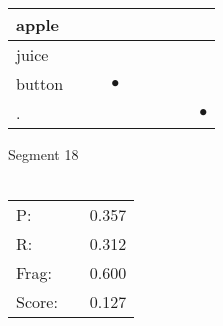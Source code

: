 \documentclass[landscape]{article}
\newcommand{\ssp}{\hspace{2pt}}
\newcommand{\mex}{\cellcolor{g}$\bullet$}
\begin{document}
\begin{tabular}{|l|p{10pt}|p{10pt}|p{10pt}|p{10pt}|p{10pt}|p{10pt}|p{10pt}|p{10pt}|}
\hline
\ssp apple \ssp&\hspace{2pt}&\hspace{2pt}&\hspace{2pt}&\hspace{2pt}&\hspace{2pt}&\hspace{2pt}&\hspace{2pt}&\hspace{2pt}\\
\hline
\ssp juice \ssp&\hspace{2pt}&\hspace{2pt}&\hspace{2pt}&\hspace{2pt}&\hspace{2pt}&\hspace{2pt}&\hspace{2pt}&\hspace{2pt}\\
\hline
\ssp \cellcolor{ref2}button \ssp&\hspace{2pt}&\hspace{2pt}&\hspace{2pt}\mex&\hspace{2pt}&\hspace{2pt}&\hspace{2pt}&\hspace{2pt}&\hspace{2pt}\\
\hline
\ssp \cellcolor{ref7}. \ssp&\hspace{2pt}&\hspace{2pt}&\hspace{2pt}&\hspace{2pt}&\hspace{2pt}&\hspace{2pt}&\hspace{2pt}&\hspace{2pt}\mex\\
\hline
\end{tabular}

\vspace{6pt}
\noindent Segment 18\\\\
\noindent\begin{tabular}{lm{12pt}r}
\hline
P:&&0.357\\
R:&&0.312\\
Frag:&&0.600\\
Score:&&0.127\\
\end{tabular}
\end{document}
